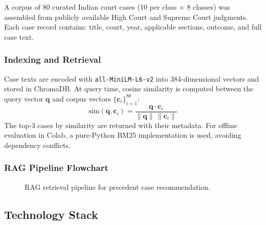 \documentclass[conference]{IEEEtran}
\begin{document}
A corpus of 80 curated Indian court cases (10 per class $\times$ 8 classes)
was assembled from publicly available High Court and Supreme Court judgments.
Each case record contains: title, court, year, applicable sections, outcome,
and full case text.

\subsubsection{Indexing and Retrieval}

Case texts are encoded with \texttt{all-MiniLM-L6-v2} into 384-dimensional
vectors and stored in ChromaDB. At query time, cosine similarity is computed
between the query vector $\mathbf{q}$ and corpus vectors
$\{\mathbf{c}_i\}_{i=1}^{80}$:
\begin{equation}
  \text{sim}(\mathbf{q}, \mathbf{c}_i)
  = \frac{\mathbf{q}\cdot\mathbf{c}_i}
         {\|\mathbf{q}\|\,\|\mathbf{c}_i\|}
\end{equation}
The top-3 cases by similarity are returned with their metadata. For offline
evaluation in Colab, a pure-Python BM25 implementation is used, avoiding
dependency conflicts.

\subsubsection{RAG Pipeline Flowchart}

\begin{figure}[ht]
\centering
{}
\caption{RAG retrieval pipeline for precedent case recommendation.}
\label{fig:rag_flow}
\end{figure}

\subsection{Technology Stack}
\end{document}
